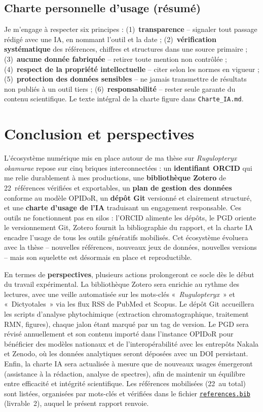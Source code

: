 \documentclass[11pt,a4paper]{article}
\begin{document}
\subsection*{Charte personnelle d'usage (résumé)}
Je m'engage à respecter six principes : (1)~\textbf{transparence} -- signaler tout
passage rédigé avec une IA, en nommant l'outil et la date ; (2)~\textbf{vérification
systématique} des références, chiffres et structures dans une source primaire ;
(3)~\textbf{aucune donnée fabriquée} -- retirer toute mention non contrôlée ;
(4)~\textbf{respect de la propriété intellectuelle} -- citer selon les normes en
vigueur ; (5)~\textbf{protection des données sensibles} -- ne jamais transmettre de
résultats non publiés à un outil tiers ; (6)~\textbf{responsabilité} -- rester seule
garante du contenu scientifique. Le texte intégral de la charte figure dans
\texttt{Charte\_IA.md}.

\section{Conclusion et perspectives}
L'écosystème numérique mis en place autour de ma thèse sur \textit{Rugulopteryx
okamurae} repose sur cinq briques interconnectées : un \textbf{identifiant ORCID}
qui me relie durablement à mes productions, une \textbf{bibliothèque Zotero} de
22~références vérifiées et exportables, un \textbf{plan de gestion des données}
conforme au modèle OPIDoR, un \textbf{dépôt Git} versionné et clairement structuré,
et une \textbf{charte d'usage de l'IA} traduisant un engagement responsable. Ces
outils ne fonctionnent pas en silos : l'ORCID alimente les dépôts, le PGD oriente
le versionnement Git, Zotero fournit la bibliographie du rapport, et la charte IA
encadre l'usage de tous les outils génératifs mobilisés. Cet écosystème évoluera
avec la thèse -- nouvelles références, nouveaux jeux de données, nouvelles versions
-- mais son squelette est désormais en place et reproductible.

En termes de \textbf{perspectives}, plusieurs actions prolongeront ce socle dès le
début du travail expérimental. La bibliothèque Zotero sera enrichie au rythme des
lectures, avec une veille automatisée sur les mots-clés «~\textit{Rugulopteryx}~»
et «~Dictyotales~» via les flux RSS de PubMed et Scopus. Le dépôt Git accueillera
les scripts d'analyse phytochimique (extraction chromatographique, traitement RMN,
figures), chaque jalon étant marqué par un tag de version. Le PGD sera révisé
annuellement et son contenu importé dans l'instance OPIDoR pour bénéficier des
modèles nationaux et de l'interopérabilité avec les entrepôts Nakala et Zenodo,
où les données analytiques seront déposées avec un DOI persistant. Enfin, la charte
IA sera actualisée à mesure que de nouveaux usages émergeront (assistance à la
rédaction, analyse de spectres), afin de maintenir un équilibre entre efficacité
et intégrité scientifique. Les références mobilisées (22~au total) sont listées,
organisées par mots-clés et vérifiées dans le fichier
\href{https://github.com/JihanElkhattabi/rugulopteryx-okamurae-these/blob/main/references.bib}{\texttt{references.bib}}
(livrable~2), auquel le présent rapport renvoie.

\label{LastPage}
\end{document}
